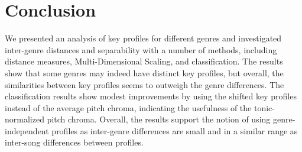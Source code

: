 \documentclass{article}
\begin{document}





\section{Conclusion}
We presented an analysis of key profiles for different genres and investigated inter-genre distances and separability with a number of methods, including distance measures, Multi-Dimensional Scaling, and classification. The results show that some genres may indeed have distinct key profiles, but overall, the similarities between key profiles seems to outweigh the genre differences. The classification results show modest improvements by using the shifted key profiles instead of the average pitch chroma, indicating the usefulness of the tonic-normalized pitch chroma. %
%
Overall, the results support the notion of using genre-independent profiles as inter-genre differences are small and in a similar range as inter-song differences between profiles. 
\end{document}
